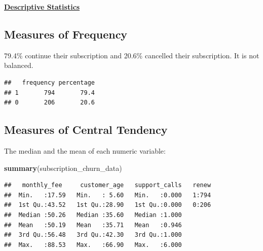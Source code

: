 \documentclass[
]{article}
\newenvironment{Shaded}{\begin{snugshade}}{\end{snugshade}}
\newcommand{\AttributeTok}[1]{\textcolor[rgb]{0.13,0.29,0.53}{#1}}
\newcommand{\DecValTok}[1]{\textcolor[rgb]{0.00,0.00,0.81}{#1}}
\newcommand{\FunctionTok}[1]{\textcolor[rgb]{0.13,0.29,0.53}{\textbf{#1}}}
\newcommand{\NormalTok}[1]{#1}
\newcommand{\OtherTok}[1]{\textcolor[rgb]{0.56,0.35,0.01}{#1}}
\newcommand{\SpecialCharTok}[1]{\textcolor[rgb]{0.81,0.36,0.00}{\textbf{#1}}}
\begin{document}
\ul{\textbf{Descriptive Statistics}}

\subsection{Measures of Frequency}\label{measures-of-frequency}

79.4\% continue their subscription and 20.6\% cancelled their
subscription. It is not balanced.

\begin{Shaded}
\end{Shaded}

\begin{verbatim}
##   frequency percentage
## 1       794       79.4
## 0       206       20.6
\end{verbatim}

\subsection{Measures of Central
Tendency}\label{measures-of-central-tendency}

The median and the mean of each numeric variable:

\begin{Shaded}
\begin{Highlighting}[]
\FunctionTok{summary}\NormalTok{(subscription\_churn\_data)}
\end{Highlighting}
\end{Shaded}

\begin{verbatim}
##   monthly_fee     customer_age   support_calls   renew  
##  Min.   :17.59   Min.   : 5.60   Min.   :0.000   1:794  
##  1st Qu.:43.52   1st Qu.:28.90   1st Qu.:0.000   0:206  
##  Median :50.26   Median :35.60   Median :1.000          
##  Mean   :50.19   Mean   :35.71   Mean   :0.946          
##  3rd Qu.:56.48   3rd Qu.:42.30   3rd Qu.:1.000          
##  Max.   :88.53   Max.   :66.90   Max.   :6.000
\end{verbatim}
\end{document}
